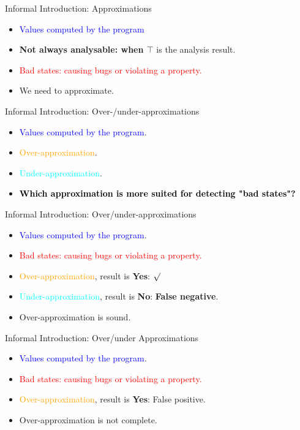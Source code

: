 \begin{frame}{Informal Introduction: Approximations}
\centering
\begin{itemize}
	\item \textcolor{blue}{Values computed by the program}
	\item \textbf{Not always analysable: when $\top$} is the analysis result.
	\item \textcolor{red}{ Bad states: causing bugs or violating a property.}
	\item We need to approximate.
\end{itemize}
\end{frame}

\begin{frame}{Informal Introduction: Over-/under-approximations}
\centering
\begin{itemize}
	\item \textcolor{blue}{Values computed by the program}.
	\item  \textcolor{orange}{Over-approximation}.
	\item  \textcolor{cyan}{Under-approximation}.
	\item \textbf{\textcolor{black}{ Which approximation is more suited for detecting "bad states"?}}
	
\end{itemize}
\end{frame}

\begin{frame}{Informal Introduction: Over/under-approximations}
\centering
\begin{itemize}
	\item \textcolor{blue}{Values computed by the program}.
		\item \textcolor{red}{ Bad states: causing bugs or violating a property.}
	\item \textcolor{orange}{Over-approximation}, result is  \textbf{Yes}: $\surd$
	\item \textcolor{cyan}{Under-approximation},  result is  \textbf{No}:\textbf{ False negative}.   
	\item Over-approximation is sound.
\end{itemize}
\end{frame}
\begin{frame}{Informal Introduction: Over/under Approximations}
\centering
\begin{itemize}
	\item \textcolor{blue}{Values computed by the program}.
	\item \textcolor{red}{ Bad states: causing bugs or violating a property.}
	\item \textcolor{orange}{Over-approximation}, result is  \textbf{Yes}: False positive.  
	\item Over-approximation is not complete.
\end{itemize}
\end{frame}


